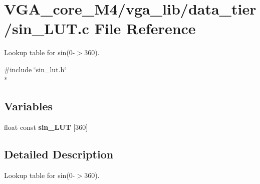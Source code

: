 \section{V\+G\+A\+\_\+core\+\_\+\+M4/vga\+\_\+lib/data\+\_\+tier/sin\+\_\+\+L\+UT.c File Reference}
\label{sin___l_u_t_8c}


Lookup table for sin(0-\/$>$360).  


{\ttfamily \#include \char`\"{}sin\+\_\+lut.\+h\char`\"{}}\\*
\subsection*{Variables}
\begin{DoxyCompactItemize}
\item 
float const {\bfseries sin\+\_\+\+L\+UT} [360]\label{sin___l_u_t_8c_a9e9478bb798561f9e58ad7ec4d328e31}

\end{DoxyCompactItemize}


\subsection{Detailed Description}
Lookup table for sin(0-\/$>$360). 

